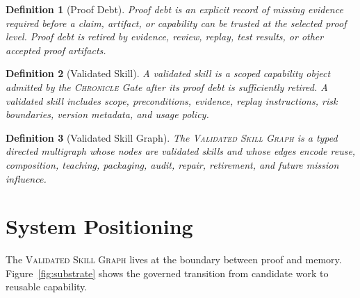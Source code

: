 \documentclass[10.5pt]{article}
\theoremstyle{goThm}
\newtheorem{definition}{Definition}
\newcommand{\vsg}{\textsc{Validated Skill Graph}}
\newcommand{\chronicle}{\textsc{Chronicle}}
\begin{document}
\begin{definition}[Proof Debt]
Proof debt is an explicit record of missing evidence required before a claim, artifact, or capability can be trusted at the selected proof level. Proof debt is retired by evidence, review, replay, test results, or other accepted proof artifacts.
\end{definition}

\begin{definition}[Validated Skill]
A validated skill is a scoped capability object admitted by the \chronicle{} Gate after its proof debt is sufficiently retired. A validated skill includes scope, preconditions, evidence, replay instructions, risk boundaries, version metadata, and usage policy.
\end{definition}

\begin{definition}[Validated Skill Graph]
The \vsg{} is a typed directed multigraph whose nodes are validated skills and whose edges encode reuse, composition, teaching, packaging, audit, repair, retirement, and future mission influence.
\end{definition}

\section{System Positioning}
The \vsg{} lives at the boundary between proof and memory. Figure~\ref{fig:substrate} shows the governed transition from candidate work to reusable capability.
\end{document}
